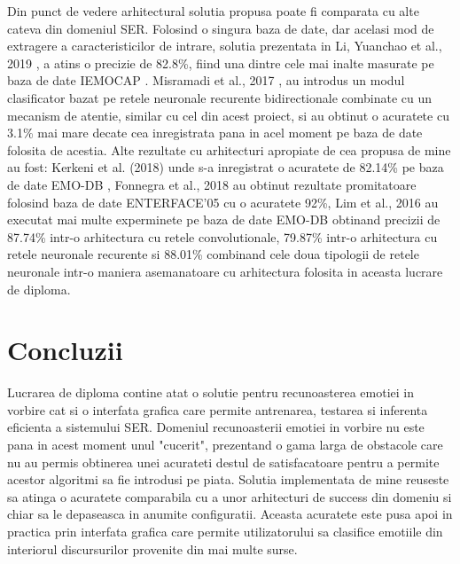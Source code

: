 \documentclass[a4paper,12pt]{book}
\begin{document}
		 Din punct de vedere arhitectural solutia propusa poate fi comparata cu alte cateva din domeniul SER. Folosind o singura baza de date, dar acelasi mod de extragere a caracteristicilor de intrare, solutia prezentata in Li, Yuanchao et al., 2019 \cite{yuan}, a atins o precizie de 82.8\%, fiind una dintre cele mai inalte masurate pe baza de date IEMOCAP \cite{iemocap}. Misramadi et al., 2017 \cite{misramadi}, au introdus un modul clasificator bazat pe retele neuronale recurente bidirectionale combinate cu un mecanism de atentie, similar cu cel din acest proiect, si au obtinut o acuratete cu 3.1\% mai mare decate cea inregistrata pana in acel moment pe baza de date folosita de acestia. Alte rezultate cu arhitecturi apropiate de cea propusa de mine au fost:  Kerkeni et al. (2018) \cite{compar1} unde s-a inregistrat o acuratete de 82.14\% pe baza de date EMO-DB \cite{emodb}, Fonnegra et al., 2018 \cite{compar2} au obtinut rezultate promitatoare folosind baza de date ENTERFACE'05 \cite{enterface} cu o acuratete 92\%, Lim et al., 2016 \cite{compar3} au executat mai multe experminete pe baza de date EMO-DB \cite{emodb} obtinand precizii de 87.74\% intr-o arhitectura cu retele convolutionale, 79.87\% intr-o arhitectura cu retele neuronale recurente si 88.01\% combinand cele doua tipologii de retele neuronale intr-o maniera asemanatoare cu arhitectura folosita in aceasta lucrare de diploma. \par
		\chapter{Concluzii}		
		Lucrarea de diploma contine atat o solutie pentru recunoasterea emotiei in vorbire cat si o interfata grafica care permite antrenarea, testarea si inferenta eficienta a sistemului SER. Domeniul recunoasterii emotiei in vorbire nu este pana in acest moment unul "cucerit", prezentand o gama larga de obstacole care nu au permis obtinerea unei acurateti destul de satisfacatoare pentru a permite acestor algoritmi sa fie introdusi pe piata. Solutia implementata de mine reuseste sa atinga o acuratete comparabila cu a unor arhitecturi de success din domeniu si chiar sa le depaseasca in anumite configuratii. Aceasta acuratete este pusa apoi in practica prin interfata grafica care permite utilizatorului sa clasifice emotiile din interiorul discursurilor provenite din mai multe surse. \par		
		
\end{document}
